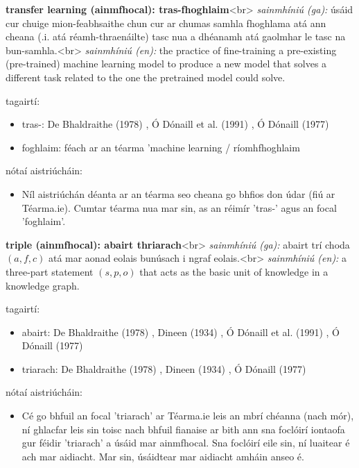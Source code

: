 \documentclass{article}
\begin{document}
\textbf{transfer learning (ainmfhocal): tras-fhoghlaim}<br>
\textit{sainmhíniú (ga):} úsáid cur chuige mion-feabhsaithe chun cur ar chumas samhla fhoghlama atá ann cheana (.i. atá réamh-thraenáilte) tasc nua a dhéanamh atá gaolmhar le tasc na bun-samhla.<br>
\textit{sainmhíniú (en):} the practice of fine-training a pre-existing (pre-trained) machine learning model to produce a new model that solves a different task related to the one the pretrained model could solve.

tagairtí:
\begin{itemize}
	\item tras-: De Bhaldraithe (1978) \cite{de-bhaldraithe}, Ó Dónaill et al. (1991) \cite{focloir-beag}, Ó Dónaill (1977) \cite{odonaill}
	\item foghlaim: féach ar an téarma 'machine learning / ríomhfhoghlaim
\end{itemize}

nótaí aistriúcháin:
\begin{itemize}
	\item Níl aistriúchán déanta ar an téarma seo cheana go bhfios don údar (fiú ar Téarma.ie). Cumtar téarma nua mar sin, as an réimír 'tras-' agus an focal 'foghlaim'.
\end{itemize}


\textbf{triple (ainmfhocal): abairt thriarach}<br>
\textit{sainmhíniú (ga):} abairt trí choda $(a,f,c)$ atá mar aonad eolais bunúsach i ngraf eolais.<br>
\textit{sainmhíniú (en):} a three-part statement $(s,p,o)$ that acts as the basic unit of knowledge in a knowledge graph.

tagairtí:
\begin{itemize}
	\item abairt: De Bhaldraithe (1978) \cite{de-bhaldraithe}, Dineen (1934) \cite{dineen}, Ó Dónaill et al. (1991) \cite{focloir-beag}, Ó Dónaill (1977) \cite{odonaill}
	\item triarach: De Bhaldraithe (1978) \cite{de-bhaldraithe}, Dineen (1934) \cite{dineen}, Ó Dónaill (1977) \cite{odonaill}
\end{itemize}

nótaí aistriúcháin:
\begin{itemize}
	\item Cé go bhfuil an focal 'triarach' ar Téarma.ie leis an mbrí chéanna (nach mór), ní ghlacfar leis sin toisc nach bhfuil fianaise ar bith ann sna foclóirí iontaofa gur féidir 'triarach' a úsáid mar ainmfhocal. Sna foclóirí eile sin, ní luaitear é ach mar aidiacht. Mar sin, úsáidtear mar aidiacht amháin anseo é.
\end{itemize}
\end{document}
